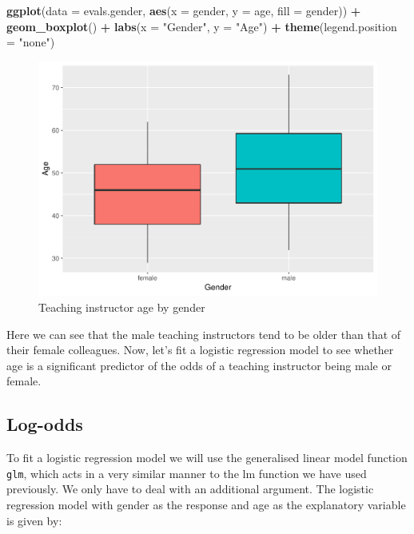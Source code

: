 \documentclass[]{article}
\newenvironment{Shaded}{\begin{snugshade}}{\end{snugshade}}
\newcommand{\KeywordTok}[1]{\textcolor[rgb]{0.13,0.29,0.53}{\textbf{#1}}}
\newcommand{\DataTypeTok}[1]{\textcolor[rgb]{0.13,0.29,0.53}{#1}}
\newcommand{\StringTok}[1]{\textcolor[rgb]{0.31,0.60,0.02}{#1}}
\newcommand{\OperatorTok}[1]{\textcolor[rgb]{0.81,0.36,0.00}{\textbf{#1}}}
\newcommand{\NormalTok}[1]{#1}
\begin{document}
\begin{Shaded}
\begin{Highlighting}[]
\KeywordTok{ggplot}\NormalTok{(}\DataTypeTok{data =}\NormalTok{ evals.gender, }\KeywordTok{aes}\NormalTok{(}\DataTypeTok{x =}\NormalTok{ gender, }\DataTypeTok{y =}\NormalTok{ age, }\DataTypeTok{fill =}\NormalTok{ gender)) }\OperatorTok{+}
\StringTok{  }\KeywordTok{geom_boxplot}\NormalTok{() }\OperatorTok{+}
\StringTok{  }\KeywordTok{labs}\NormalTok{(}\DataTypeTok{x =} \StringTok{"Gender"}\NormalTok{, }\DataTypeTok{y =} \StringTok{"Age"}\NormalTok{) }\OperatorTok{+}
\StringTok{  }\KeywordTok{theme}\NormalTok{(}\DataTypeTok{legend.position =} \StringTok{"none"}\NormalTok{)}
\end{Highlighting}
\end{Shaded}

\begin{figure}
\includegraphics[width=0.5\linewidth]{DAWeek9_files/figure-latex/boxplot1-1} \caption{\label{fig.plot1}Teaching instructor age by gender}\label{fig:boxplot1}
\end{figure}

Here we can see that the male teaching instructors tend to be older than
that of their female colleagues. Now, let's fit a logistic regression
model to see whether age is a significant predictor of the odds of a
teaching instructor being male or female.

\subsection{Log-odds}\label{log-odds}

To fit a logistic regression model we will use the generalised linear
model function \texttt{glm}, which acts in a very similar manner to the
lm function we have used previously. We only have to deal with an
additional argument. The logistic regression model with gender as the
response and age as the explanatory variable is given by:
\end{document}
